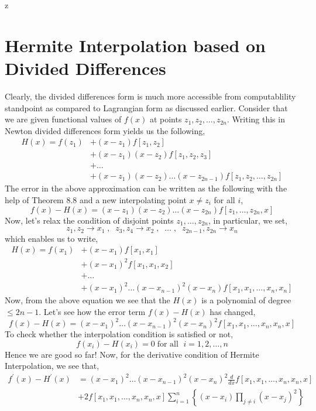 z\documentclass[a4paper,12pt,twoside]{book}
\newcommand{\nll}[0]{\newline\newline}
\newcommand{\der}[2]{\frac{d #1}{d #2}}
\begin{document}
\section{Hermite Interpolation based on Divided Differences}
Clearly, the divided differences form is much more accessible from computablility standpoint as compared to Lagrangian form as discussed earlier.
\nll
Consider that we are given functional values of $f(x)$ at points $z_1,z_2,\dots,z_{2n}$. Writing this in Newton divided differences form yields us the following,
\begin{equation}
    \begin{split}
        H(x) = f(z_1) &+ (x-z_1)f[z_1,z_2] \\
        &+ (x-z_1)(x-z_2)f[z_1,z_2,z_3]\\
        &+\dots\\
        &+(x-z_1)(x-z_2)\dots(x-z_{2n-1})f[z_1,z_2,\dots,z_{2n}]
    \end{split}
\end{equation}
The error in the above approximation can be written as the following with the help of Theorem 8.8 and a new interpolating point $x\neq z_i$ for all $i$,
\begin{equation}
    f(x) - H(x) = (x-z_1)(x-z_2)\dots(x-z_{2n})f[z_1,\dots,z_{2n},x]
\end{equation}
Now, let's relax the condition of disjoint points $z_1,\dots,z_{2n}$, in particular, we set,
\[z_1,z_2 \to x_1 \;,\;\; z_3,z_4\to x_2\;,\;\;\dots\;,\;\;z_{2n-1},z_{2n} \to x_n\]
which enables us to write,
\begin{equation}
    \begin{split}
        H(x) = f(x_1) &+ (x-x_1)f[x_1,x_1]\\
        &+ (x-x_1)^2f[x_1,x_1,x_2]\\
        &+ \dots\\
        &+ (x-x_1)^2\dots(x-x_{n-1})^2(x-x_n)f[x_1,x_1,\dots,x_n,x_n]
    \end{split}
\end{equation}
Now, from the above equation we see that the $H(x)$ is a polynomial of degree $\le 2n-1$. 
\nll
Let's see how the error term $f(x)-H(x)$ has changed,
\[f(x) - H(x) = (x-x_1)^2\dots(x-x_{n-1})^2(x-x_n)^2f[x_1,x_1,\dots,x_n,x_n,x]\]
To check whether the interpolation condition is satisfied or not, 
\[\boxed{f(x_i)-H(x_i) = 0 \;\text{for all }\;i=1,2,\dots,n}\]
Hence we are good so far!
\nll
Now, for the derivative condition of Hermite Interpolation, we see that,
\begin{equation}
    \begin{split}
        f^\prime(x)-H^\prime(x) &= (x-x_1)^2\dots(x-x_{n-1})^2(x-x_n)^2\der{}{x} f[x_1,x_1,\dots,x_n,x_n,x]\\
        &+ 2f[x_1,x_1,\dots,x_n,x_n,x]\sum_{i=1}^n\left\{ (x-x_i) \prod_{j\neq i} (x-x_j)^2 \right\}
    \end{split}
\end{equation}
\end{document}

